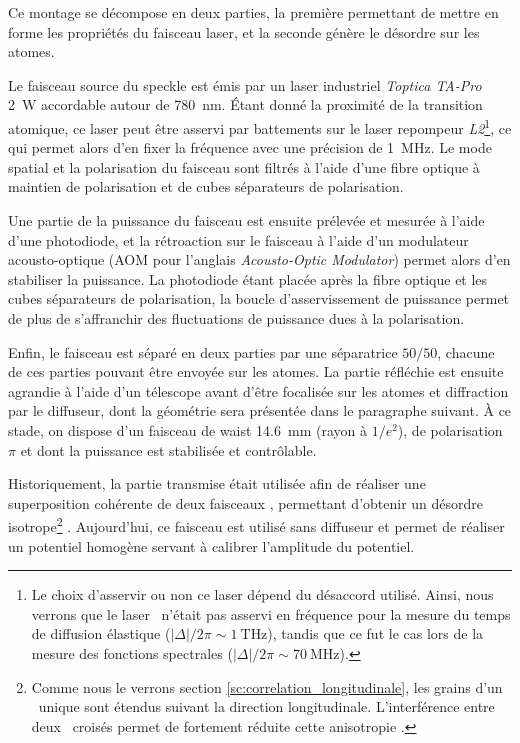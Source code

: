 Ce montage se décompose en deux parties, la première permettant de mettre en forme les propriétés du faisceau laser, et la seconde génère le désordre sur les atomes.

Le faisceau source du speckle est émis par un laser industriel \emph{Toptica TA-Pro} \SI{2}{\watt} accordable autour de \SI{780}{\nano\metre}. Étant donné la proximité de la transition atomique, ce laser peut être asservi par battements sur le laser repompeur \emph{L2}\footnote{Le choix d'asservir ou non ce laser dépend du désaccord utilisé. Ainsi, nous verrons que le laser \speckle\ n'était pas asservi en fréquence pour la mesure du temps de diffusion élastique ($\left|\Delta\right|/2\pi\sim\SI{1}{\tera\hertz}$), tandis que ce fut le cas lors de la mesure des fonctions spectrales ($\left|\Delta\right|/2\pi\sim\SI{70}{\mega\hertz}$).}, ce qui permet alors d'en fixer la fréquence avec une précision de \SI{1}{\mega\hertz}. Le mode spatial et la polarisation du faisceau sont filtrés à l'aide d'une fibre optique à maintien de polarisation et de cubes séparateurs de polarisation. 

Une partie de la puissance du faisceau est ensuite prélevée et mesurée à l'aide d'une photodiode, et la rétroaction sur le faisceau à l'aide d'un modulateur acousto-optique (AOM pour l'anglais \emph{Acousto-Optic Modulator}) permet alors d'en stabiliser la puissance. La photodiode étant placée après la fibre optique et les cubes séparateurs de polarisation, la boucle d'asservissement de puissance permet de plus de s'affranchir des fluctuations de puissance dues à la polarisation. 

Enfin, le faisceau est séparé en deux parties par une séparatrice $50/50$, chacune de ces parties pouvant être envoyée sur les atomes. La partie réfléchie est ensuite agrandie à l'aide d'un télescope avant d'être focalisée sur les atomes et diffraction par le diffuseur, dont la géométrie sera présentée dans le paragraphe suivant. À ce stade, on dispose d'un faisceau de waist \SI{14.6}{\milli\metre} (rayon à $1/e^2$), de polarisation $\pi$ et dont la puissance est stabilisée et contrôlable.

Historiquement, la partie transmise était utilisée afin de réaliser une superposition cohérente de deux faisceaux \speckle , permettant d'obtenir un désordre isotrope\footnote{Comme nous le verrons section \ref{sc:correlation_longitudinale}, les grains d'un \speckle\ unique sont étendus suivant la direction longitudinale. L'interférence entre deux \speckles\ croisés permet de fortement réduite cette anisotropie \citep{piraud2012localisation}.} \citep{jendrzejewski2012quantum}. Aujourd'hui, ce faisceau est utilisé sans diffuseur et permet de réaliser un potentiel homogène servant à calibrer l'amplitude du potentiel.




